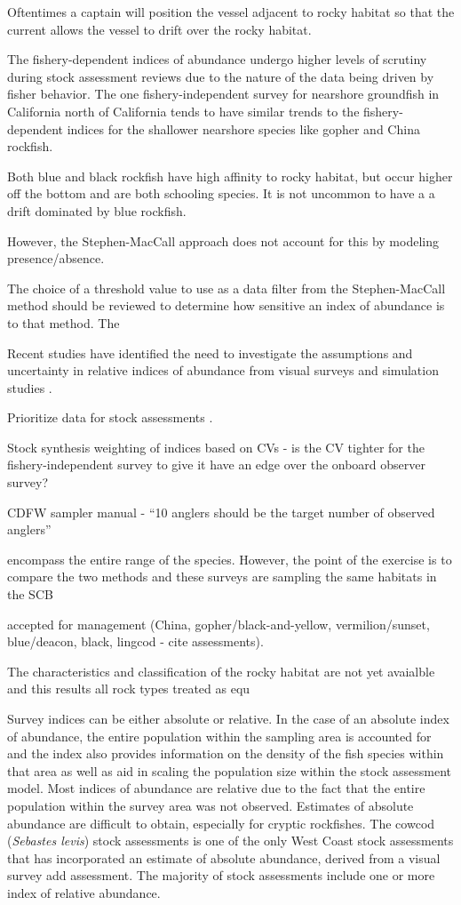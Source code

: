 \documentclass[
  authoryear,
  preprint,
  3p]{elsarticle}
\begin{document}
Oftentimes a captain will position the vessel adjacent to rocky habitat
so that the current allows the vessel to drift over the rocky habitat.

The fishery-dependent indices of abundance undergo higher levels of
scrutiny during stock assessment reviews due to the nature of the data
being driven by fisher behavior. The one fishery-independent survey for
nearshore groundfish in California north of California tends to have
similar trends to the fishery-dependent indices for the shallower
nearshore species like gopher and China rockfish.

Both blue and black rockfish have high affinity to rocky habitat, but
occur higher off the bottom and are both schooling species. It is not
uncommon to have a a drift dominated by blue rockfish.

However, the Stephen-MacCall approach does not account for this by
modeling presence/absence.

The choice of a threshold value to use as a data filter from the
Stephen-MacCall method should be reviewed to determine how sensitive an
index of abundance is to that method. The

Recent studies have identified the need to investigate the assumptions
and uncertainty in relative indices of abundance from visual surveys
\citep{Bacheler:2015:ERA, Campbell:2015:CRA} and simulation studies
\citep{Siegfried:2016:ISA}.

Prioritize data for stock assessments \citep{Magnusson:2007:WMF}.

Stock synthesis weighting of indices based on CVs - is the CV tighter
for the fishery-independent survey to give it have an edge over the
onboard observer survey?

CDFW sampler manual - ``10 anglers should be the target number of
observed anglers''

encompass the entire range of the species. However, the point of the
exercise is to compare the two methods and these surveys are sampling
the same habitats in the SCB

accepted for management (China, gopher/black-and-yellow,
vermilion/sunset, blue/deacon, black, lingcod - cite assessments).

The characteristics and classification of the rocky habitat are not yet
avaialble and this results all rock types treated as equ

Survey indices can be either absolute or relative. In the case of an
absolute index of abundance, the entire population within the sampling
area is accounted for and the index also provides information on the
density of the fish species within that area as well as aid in scaling
the population size within the stock assessment model. Most indices of
abundance are relative due to the fact that the entire population within
the survey area was not observed. Estimates of absolute abundance are
difficult to obtain, especially for cryptic rockfishes. The cowcod
(\emph{Sebastes levis}) stock assessments is one of the only West Coast
stock assessments that has incorporated an estimate of absolute
abundance, derived from a visual survey \citep{Love:2009:DFA} add
assessment. The majority of stock assessments include one or more index
of relative abundance.
\end{document}
